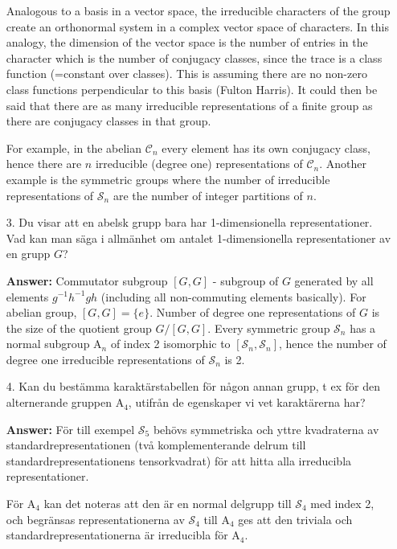 \documentclass[12pt,a4paper]{article}
\theoremstyle{definition}
\theoremstyle{remark}
\numberwithin{equation}{section}
\newcommand{\1}{\mathbf{1}}
\newcommand{\0}{\mathbf{0}}
\newcommand{\Sym}{\mathcal{S}} %
\newcommand{\Cyc}{\mathcal{C}}%
\begin{document}
\begin{enumerate}
			 Analogous to a basis in a vector space, the irreducible characters of the group create an orthonormal system in a complex vector space of characters. In this analogy, the dimension of the vector space is the number of entries in the character which is the number of conjugacy classes, since the trace is a class function (=constant over classes). This is assuming there are no non-zero class functions perpendicular to this basis (Fulton Harris). It could then be said that there are as many irreducible representations of a finite group as there are conjugacy classes in that group.
			
			For example, in the abelian $\Cyc_n$ every element has its own conjugacy class, hence there are $n$ irreducible (degree one) representations of $\Cyc_n$. Another example is the symmetric groups where the number of irreducible representations of $\Sym_n$ are the number of integer partitions of $n$.
			
		\item[3.] Du visar att en abelsk grupp bara har 1-dimensionella representationer. Vad kan man säga i allmänhet om antalet 1-dimensionella representationer av en grupp $G$?
		
			 \textbf{Answer:} Commutator subgroup $[G,G]$ - subgroup of $G$ generated by all elements $g^{-1}h^{-1}gh$ (including all non-commuting elements basically). For abelian group, $[G,G] = \{e\}$. Number of degree one representations of $G$ is the size of the quotient group $G/[G,G]$. Every symmetric group $\Sym_n$ has a normal subgroup $\text{A}_n$ of index 2 isomorphic to $[\Sym_n, \Sym_n]$, hence the number of degree one irreducible representations of $\Sym_n$ is 2.
			
		\item[4.] Kan du bestämma karaktärstabellen för någon annan grupp, t ex för den alternerande gruppen $\text{A}_4$, utifrån de egenskaper vi vet karaktärerna har?
		
			\textbf{Answer:} För till exempel $\Sym_5$ behövs symmetriska och yttre kvadraterna av standardrepresentationen (två komplementerande delrum till standardrepresentationens tensorkvadrat) för att hitta alla irreducibla representationer.  
			
			För $\text{A}_4$ kan det noteras att den är en normal delgrupp till $\Sym_4$ med index 2, och begränsas representationerna av $\Sym_4$ till $\text{A}_4$ ges att den triviala och standardrepresentationerna är irreducibla för $\text{A}_4$.
			
	\end{enumerate}
				
\end{document}
